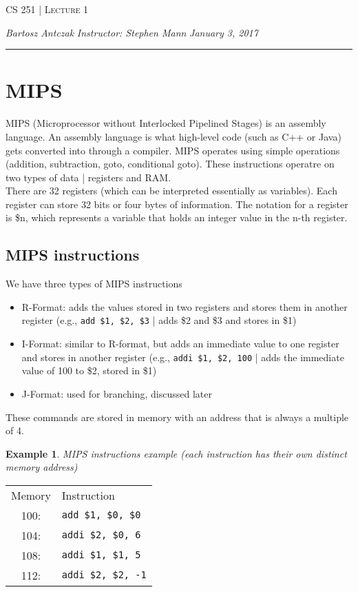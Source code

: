 \documentclass{report}
\newcommand{\lectureNum}{1}
\newcommand{\curDate}{January 3, 2017}
\newcommand{\course}{CS 251}
\newcommand{\instructor}{Stephen Mann}
\newtheorem{ex}{Example}[section]
\begin{document}
\begin{center}
\begin{Large}
\textsc{\course{} | Lecture \lectureNum{}}
\end{Large}
\end{center} 
\noindent \textit{Bartosz Antczak} \hfill
\textit{Instructor: \instructor{}} \hfill
\textit{\curDate{}}
\rule{\textwidth}{0.4pt}
\section{MIPS}
MIPS (Microprocessor without Interlocked Pipelined Stages) is an assembly language. An assembly language is what high-level code (such as C++ or Java) gets converted into through a compiler. MIPS operates using simple operations (addition, subtraction, goto, conditional goto). These instructions operatre on two types of data | registers and RAM.\\
There are 32 registers (which can be interpreted essentially as variables). Each register can store 32 bits or four bytes of information. The notation for a register is \$n, which represents a variable that holds an integer value in the n-th register.
\subsection{MIPS instructions}
We have three types of MIPS instructions
\begin{itemize}
\item R-Format: adds the values stored in two registers and stores them in another register (e.g., \texttt{add \$1, \$2, \$3} | adds \$2 and \$3 and stores in \$1)
\item I-Format: similar to R-format, but adds an immediate value to one register and stores in another register (e.g., \texttt{addi \$1, \$2, 100} | adds the immediate value of 100 to \$2, stored in \$1)
\item J-Format: used for branching, discussed later
\end{itemize}
These commands are stored in memory with an address that is always a multiple of 4.
\begin{ex}
MIPS instructions example (each instruction has their own distinct memory address)
\end{ex}
\begin{center}
\begin{tabular}{ c  l }
Memory & Instruction \\
100: & \texttt{add \$1, \$0, \$0} \\
104: & \texttt{addi \$2, \$0, 6} \\
108: & \texttt{addi \$1, \$1, 5} \\
112: & \texttt{addi \$2, \$2, -1}
\end{tabular}
\end{center}
\end{document}
